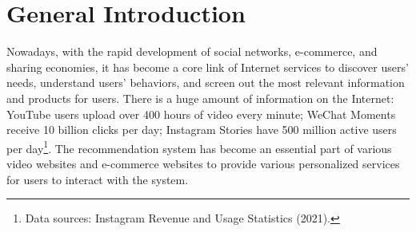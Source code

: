 \section{General Introduction}
Nowadays, with the rapid development of social networks, e-commerce, and sharing economies, it has become a core link of Internet services to discover users' needs, understand users' behaviors, and screen out the most relevant information and products for users. There is a huge amount of information on the Internet: YouTube users upload over 400 hours of video every minute; WeChat Moments receive 10 billion clicks per day; Instagram Stories have 500 million active users per day\footnote{Data sources: Instagram Revenue and Usage Statistics (2021).}. The recommendation system has become an essential part of various video websites and e-commerce websites to provide various personalized services for users to interact with the system.

